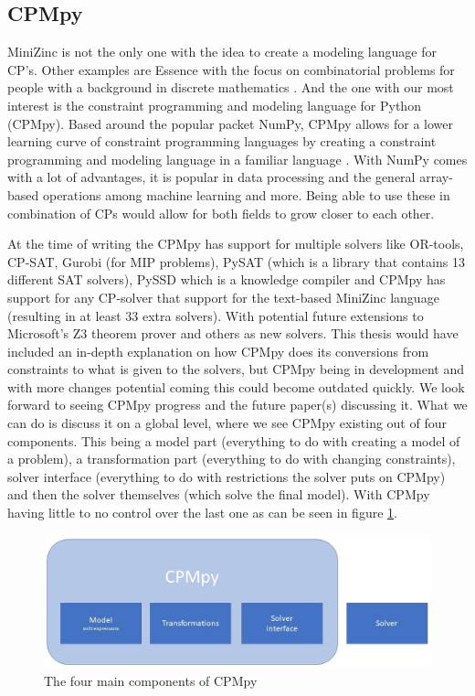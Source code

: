 \subsection{CPMpy}
\label{CP:CPMpy}
MiniZinc is not the only one with the idea to create a modeling language for CP's. Other examples are Essence with the focus on combinatorial problems for people with a background in discrete mathematics \cite{70frisch2008essence}.
And the one with our most interest is the constraint programming and modeling language for Python (CPMpy). Based around the popular packet NumPy, CPMpy allows for a lower learning curve of constraint programming languages by creating a constraint programming and modeling language in a familiar language \cite{17guns2019increasing}. 
With NumPy comes with a lot of advantages, it is popular in data processing and the general array-based operations among machine learning and more. 
Being able to use these in combination of CPs would allow for both fields to grow closer to each other. 


At the time of writing the CPMpy has support for multiple solvers like OR-tools, CP-SAT, Gurobi (for MIP problems), PySAT (which is a library that contains 13 different SAT solvers), PySSD which is a knowledge compiler and CPMpy has support for any CP-solver that support for the text-based MiniZinc language \cite{CPMpyDoc, CPMpyGithub} (resulting in at least 33 extra solvers). With potential future extensions to Microsoft's Z3 theorem prover and others as new solvers.
This thesis would have included an in-depth explanation on how CPMpy does its conversions from constraints to what is given to the solvers, but CPMpy being in development and with more changes potential coming this could become outdated quickly. We look forward to seeing CPMpy progress and the future paper(s) discussing it. What we can do is discuss it on a global level, where we see CPMpy existing out of four components. This being a model part (everything to do with creating a model of a problem), a transformation part (everything to do with changing constraints), solver interface (everything to do with restrictions the solver puts on CPMpy) and then the solver themselves (which solve the final model). With CPMpy having little to no control over the last one as can be seen in figure \ref{fig:4ComponentsOfCPMpy}.

\begin{figure}[h]
	\centering
	\includegraphics[width=1.0\textwidth]{images/4componentsOfCPMpy}
	\caption{The four main components of CPMpy}
	\label{fig:4ComponentsOfCPMpy}
\end{figure}

